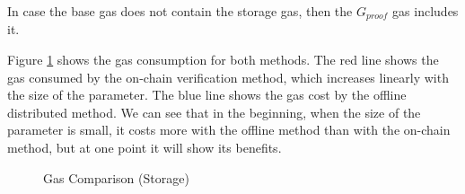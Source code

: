 \documentclass[runningheads]{llncs}
\begin{document}
In case the base gas does not contain the storage gas, then the \( G_{proof} \) gas includes it.

Figure \ref{fig:gas_compare} shows the gas consumption for both methods. The red line shows the gas consumed by the on-chain verification method, which increases linearly with the size of the parameter. The blue line shows the gas cost by the offline distributed method. We can see that in the beginning, when the size of the parameter is small, it costs more with the offline method than with the on-chain method, but at one point it will show its benefits.

\begin{figure}
  \centering
  \caption{Gas Comparison (Storage)}
  \label{fig:gas_compare}
\end{figure}
\end{document}
